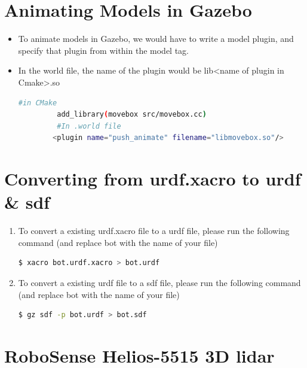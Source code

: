 \documentclass[11pt]{article}
\begin{document}
\section{Animating Models in Gazebo}
\begin{itemize}
 \item {
       To animate models in Gazebo, we would have to write a model plugin, and specify that plugin from within the model tag.
       }
 \item {
       In the world file, the name of the plugin would be
       lib<name of plugin in Cmake>.so

       \begin{lstlisting}[language=bash]
         #in CMake
         add_library(movebox src/movebox.cc)
         #In .world file
        <plugin name="push_animate" filename="libmovebox.so"/>
       \end{lstlisting}

       }
\end{itemize}
\section{Converting from urdf.xacro to urdf \& sdf}
\label{sec:conversion}
\begin{enumerate}
 \item {
       To convert a existing urdf.xacro file to a urdf file, please run the following command (and replace
       bot with the name of your file)
       \begin{lstlisting}[language=bash]
$ xacro bot.urdf.xacro > bot.urdf
\end{lstlisting}
       }
 \item {
       To convert a existing urdf file to a sdf file, please run the following command (and replace
       bot with the name of your file)
       \begin{lstlisting}[language=bash]
$ gz sdf -p bot.urdf > bot.sdf
\end{lstlisting}
       }

\end{enumerate}

\section{RoboSense Helios-5515 3D lidar}
\end{document}
